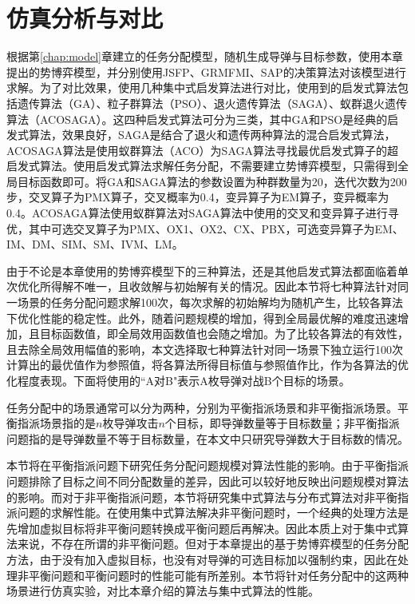 \section{仿真分析与对比}
\label{pg:simulation}

根据第\ref{chap:model}章建立的任务分配模型，随机生成导弹与目标参数，使用本章提出的势博弈模型，并分别使用JSFP、GRMFMI、SAP的决策算法对该模型进行求解。为了对比效果，使用几种集中式启发算法进行对比，使用到的启发式算法包括遗传算法（GA）、粒子群算法（PSO）、退火遗传算法（SAGA）、蚁群退火遗传算法（ACOSAGA）。这四种启发式算法可分为三类，其中GA和PSO是经典的启发式算法，效果良好，SAGA是结合了退火和遗传两种算法的混合启发式算法，ACOSAGA算法是使用蚁群算法（ACO）为SAGA算法寻找最优启发式算子的超启发式算法。使用启发式算法求解任务分配，不需要建立势博弈模型，只需得到全局目标函数即可。将GA和SAGA算法的参数设置为种群数量为20，迭代次数为200步，交叉算子为PMX算子，交叉概率为0.4，变异算子为EM算子，变异概率为0.4。ACOSAGA算法使用蚁群算法对SAGA算法中使用的交叉和变异算子进行寻优，其中可选交叉算子为PMX、OX1、OX2、CX、PBX，可选变异算子为EM、IM、DM、SIM、SM、IVM、LM。

由于不论是本章使用的势博弈模型下的三种算法，还是其他启发式算法都面临着单次优化所得解不唯一，且收敛解与初始解有关的情况。因此本节将七种算法针对同一场景的任务分配问题求解100次，每次求解的初始解均为随机产生，比较各算法下优化性能的稳定性。此外，随着问题规模的增加，得到全局最优解的难度迅速增加，且目标函数值，即全局效用函数值也会随之增加。为了比较各算法的有效性，且去除全局效用幅值的影响，本文选择取七种算法针对同一场景下独立运行100次计算出的最优值作为参照值，将各算法所得目标值与参照值作比，作为各算法的优化程度表现。下面将使用的“A对B"表示A枚导弹对战B个目标的场景。

任务分配中的场景通常可以分为两种，分别为平衡指派场景和非平衡指派场景。平衡指派场景指的是$n$枚导弹攻击$n$个目标，即导弹数量等于目标数量；非平衡指派问题指的是导弹数量不等于目标数量，在本文中只研究导弹数大于目标数的情况。

本节将在平衡指派问题下研究任务分配问题规模对算法性能的影响。由于平衡指派问题排除了目标之间不同分配数量的差异，因此可以较好地反映出问题规模对算法的影响。而对于非平衡指派问题，本节将研究集中式算法与分布式算法对非平衡指派问题的求解性能。在使用集中式算法解决非平衡问题时，一个经典的处理方法是先增加虚拟目标将非平衡问题转换成平衡问题后再解决。因此本质上对于集中式算法来说，不存在所谓的非平衡问题。但对于本章提出的基于势博弈模型的任务分配方法，由于没有加入虚拟目标，也没有对导弹的可选目标加以强制约束，因此在处理非平衡问题和平衡问题时的性能可能有所差别。本节将针对任务分配中的这两种场景进行仿真实验，对比本章介绍的算法与集中式算法的性能。

